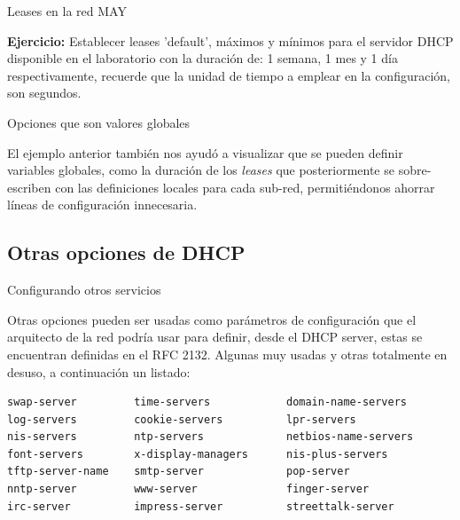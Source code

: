 \begin{frame}{Leases en la red MAY}
\framebreak

    \textbf{Ejercicio:} Establecer leases 'default', máximos y mínimos para el
    servidor DHCP disponible en el laboratorio con la duración de: 1 semana, 1
    mes y 1 día respectivamente, recuerde que la unidad de tiempo a emplear en
    la configuración, son segundos.\\[0.2cm]
    
\end{frame}

\begin{frame}{Opciones que son valores globales}

    El ejemplo anterior también nos ayudó a visualizar que se pueden definir
    variables globales, como la duración de los \textit{leases} que
    posteriormente se sobre-escriben con las definiciones locales para cada
    sub-red, permitiéndonos ahorrar líneas de configuración
    innecesaria.\\[0.2cm]
    
\end{frame}

\subsection{Otras opciones de DHCP} %
\label{sub:Otras opciones de DHCP}


\begin{frame}{Configurando otros servicios}
    
    Otras opciones pueden ser usadas como parámetros de configuración que el
    arquitecto de la red podría usar para definir, desde el DHCP server, estas
    se encuentran definidas en el RFC 2132. Algunas muy usadas y otras
    totalmente en desuso, a continuación un listado:

    \begin{verbatim}
swap-server         time-servers            domain-name-servers
log-servers         cookie-servers          lpr-servers
nis-servers         ntp-servers             netbios-name-servers
font-servers        x-display-managers      nis-plus-servers
tftp-server-name    smtp-server             pop-server
nntp-server         www-server              finger-server
irc-server          impress-server          streettalk-server 
    \end{verbatim} 

\end{frame}




